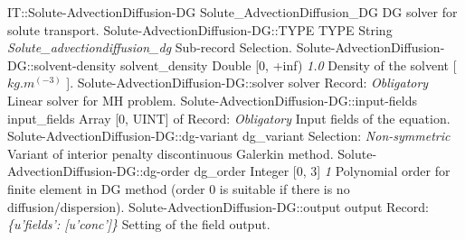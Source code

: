 \begin{RecordType}
	{IT::Solute-AdvectionDiffusion-DG}
	{Solute{\_}AdvectionDiffusion{\_}DG}
	{} %
	{} %
	{{{DG solver for solute transport.}}}
		\RecKey
			{Solute-AdvectionDiffusion-DG::TYPE}
			{TYPE}
			{{String}}
			{ \it{Solute{\_}advectiondiffusion{\_}dg} }
			{{{Sub-record Selection.}}}
		\RecKey
			{Solute-AdvectionDiffusion-DG::solvent-density}
			{solvent{\_}density}
			{{Double [0, +inf)}}
			{ \it{1.0} }
			{{{Density of the solvent [ }{$kg.m^(-3)$}{ ].}}}
		\RecKey
			{Solute-AdvectionDiffusion-DG::solver}
			{solver}
			{{Record}{: }}
			{ \it{Obligatory} }
			{{{Linear solver for MH problem.}}}
		\RecKey
			{Solute-AdvectionDiffusion-DG::input-fields}
			{input{\_}fields}
			{{Array [0, UINT] of }{Record}{: }}
			{ \it{Obligatory} }
			{{{Input fields of the equation.}}}
		\RecKey
			{Solute-AdvectionDiffusion-DG::dg-variant}
			{dg{\_}variant}
			{{Selection}{: }}
			{ \it{Non-symmetric} }
			{{{Variant of interior penalty discontinuous Galerkin method.}}}
		\RecKey
			{Solute-AdvectionDiffusion-DG::dg-order}
			{dg{\_}order}
			{{Integer [0, 3]}}
			{ \it{1} }
			{{{Polynomial order for finite element in DG method (order 0 is suitable if there is no diffusion/dispersion).}}}
		\RecKey
			{Solute-AdvectionDiffusion-DG::output}
			{output}
			{{Record}{: }}
			{ \it{{\{}u'fields': [u'conc']{\}}} }
			{{{Setting of the field output.}}}
\end{RecordType}
